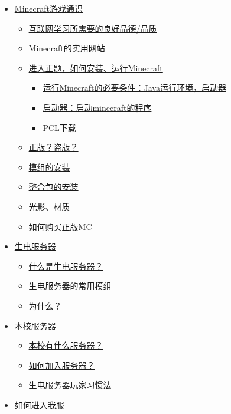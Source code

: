 \documentclass[
]{article}
\providecommand{\tightlist}{%
  \setlength{\itemsep}{0pt}\setlength{\parskip}{0pt}}
\begin{document}
\begin{itemize}
\item
  \hyperref[minecraft]{Minecraft游戏通识}

  \begin{itemize}
  \item
    \hyperref[section-2]{互联网学习所需要的良好品德/品质}
  \item
    \hyperref[minecraft-1]{Minecraft的实用网站}
  \item
    \hyperref[minecraft-2]{进入正题，如何安装、运行Minecraft}

    \begin{itemize}
    \tightlist
    \item
      \hyperref[minecraftjava]{运行Minecraft的必要条件：Java运行环境，启动器}
    \item
      \hyperref[minecraft-3]{启动器：启动minecraft的程序}
    \item
      \hyperref[pcl]{PCL下载}
    \end{itemize}
  \item
    \hyperref[section-3]{正版？盗版？}
  \item
    \hyperref[section-4]{模组的安装}
  \item
    \hyperref[section-5]{整合包的安装}
  \item
    \hyperref[section-6]{光影、材质}
  \item
    \hyperref[mc]{如何购买正版MC}
  \end{itemize}
\item
  \hyperref[section-7]{生电服务器}

  \begin{itemize}
  \tightlist
  \item
    \hyperref[section-8]{什么是生电服务器？}
  \item
    \hyperref[section-9]{生电服务器的常用模组}
  \item
    \hyperref[section-10]{为什么？}
  \end{itemize}
\item
  \hyperref[section-11]{本校服务器}

  \begin{itemize}
  \tightlist
  \item
    \hyperref[section-12]{本校有什么服务器？}
  \item
    \hyperref[section-13]{如何加入服务器？}
  \item
    \hyperref[section-14]{生电服务器玩家习惯法}
  \end{itemize}
\item
  \hyperref[section-15]{如何进入我服}


\end{itemize}
\end{document}
